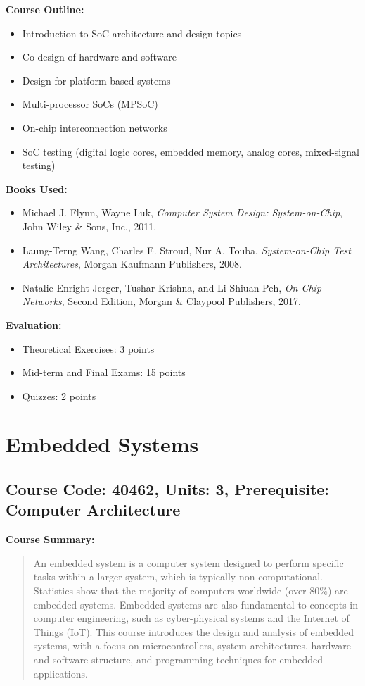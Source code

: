 \documentclass[12pt]{article}
\begin{document}
\textbf{Course Outline:}
\begin{itemize}
    \item Introduction to SoC architecture and design topics
    \item Co-design of hardware and software
    \item Design for platform-based systems
    \item Multi-processor SoCs (MPSoC)
    \item On-chip interconnection networks
    \item SoC testing (digital logic cores, embedded memory, analog cores, mixed-signal testing)
\end{itemize}

\textbf{Books Used:}
\begin{itemize}
    \item Michael J. Flynn, Wayne Luk, \textit{Computer System Design: System-on-Chip}, John Wiley \& Sons, Inc., 2011.
    \item Laung-Terng Wang, Charles E. Stroud, Nur A. Touba, \textit{System-on-Chip Test Architectures}, Morgan Kaufmann Publishers, 2008.
    \item Natalie Enright Jerger, Tushar Krishna, and Li-Shiuan Peh, \textit{On-Chip Networks}, Second Edition, Morgan \& Claypool Publishers, 2017.
\end{itemize}

\textbf{Evaluation:}
\begin{itemize}
    \item Theoretical Exercises: 3 points
    \item Mid-term and Final Exams: 15 points
    \item Quizzes: 2 points
\end{itemize}


\newpage

\section{Embedded Systems}
\subsection*{Course Code: 40462, Units: 3, Prerequisite: Computer Architecture}

\textbf{Course Summary:} 
\begin{quote}
   An embedded system is a computer system designed to perform specific tasks within a larger system, which is typically non-computational. Statistics show that the majority of computers worldwide (over 80\%) are embedded systems. Embedded systems are also fundamental to concepts in computer engineering, such as cyber-physical systems and the Internet of Things (IoT). This course introduces the design and analysis of embedded systems, with a focus on microcontrollers, system architectures, hardware and software structure, and programming techniques for embedded applications.
\end{quote}
\end{document}
